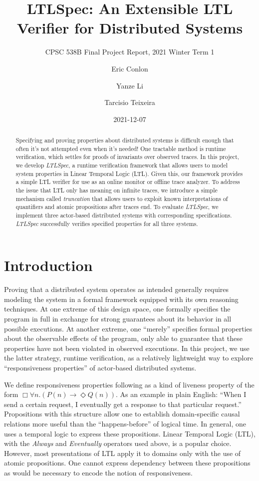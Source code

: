 \documentclass[format=acmsmall, nonacm=true, review=true, screen=true]{acmart}
\title{LTLSpec: An Extensible LTL Verifier for Distributed Systems}
\subtitle{CPSC 538B Final Project Report, 2021 Winter Term 1}
\author{Eric Conlon}
\author{Yanze Li}
\author{Tarcisio Teixeira}
\date{2021-12-07}
\newcommand{\ltlspec}{\textit{LTLSpec}\xspace}
\begin{document}
\begin{abstract}
  Specifying and proving properties about distributed systems is difficult enough that often it's not attempted even when it's needed!
  One tractable method is runtime verification, which settles for proofs of invariants over observed traces.
  In this project, we develop \ltlspec, a runtime verification framework that allows users to model system properties in Linear Temporal Logic (LTL).
  Given this, our framework provides a simple LTL verifier for use as an online monitor or offline trace analyzer.
  To address the issue that LTL only has meaning on infinite traces, we introduce a simple mechanism called \textit{truncation} that allows users to exploit known interpretations of quantifiers and atomic propositions after traces end.
  To evaluate \ltlspec, we implement three actor-based distributed systems with corresponding specifications. \ltlspec successfully verifies specified properties for all three systems.
\end{abstract}

\maketitle

\section{Introduction}

Proving that a distributed system operates as intended generally requires modeling the system in a formal framework equipped with its own reasoning techniques.
At one extreme of this design space, one formally specifies the program in full in exchange for strong guarantees about its behavior in all possible executions.
At another extreme, one “merely” specifies formal properties about the observable effects of the program, only able to guarantee that these properties have not been violated in observed executions.
In this project, we use the latter strategy, runtime verification, as a relatively lightweight way to explore “responsiveness properties” of actor-based distributed systems.

We define responsiveness properties following \cite{actorservice,parthasarathy2018modular} as a kind of liveness property of the form \(\Box \forall n. (P(n) \rightarrow \Diamond Q(n))\).
As an example in plain English: “When I send a certain request, I eventually get a response to that particular request.” Propositions with this structure allow one to establish domain-specific causal relations more useful than the “happens-before” of logical time.
In general, one uses a temporal logic to express these propositions. Linear Temporal Logic (LTL), with the \textit{Always} and \textit{Eventually} operators used above, is a popular choice. However, most presentations of LTL apply it to domains only with the use of atomic propositions. One cannot express dependency between these propositions as would be necessary to encode the notion of responsiveness.
\end{document}
